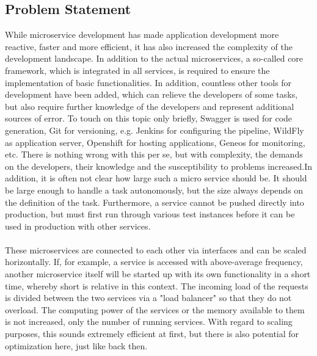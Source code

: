 \documentclass[a4paper,twoside,11pt, pagesize]{scrartcl}
\begin{document}
\begin{spacing}{1.2}
\subsection{Problem Statement}
While microservice development has made application development more reactive, faster and more efficient, it has also increased the complexity of the development landscape. In addition to the actual microservices, a so-called core framework, which is integrated in all services, is required to ensure the implementation of basic functionalities. In addition, countless other tools for development have been added, which can relieve the developers of some tasks, but also require further knowledge of the developers and represent additional sources of error. To touch on this topic only briefly, Swagger is used for code generation, Git for versioning, e.g. Jenkins for configuring the pipeline, WildFly as application server, Openshift for hosting applications, Geneos for monitoring, etc. There is nothing wrong with this per se, but with complexity, the demands on the developers, their knowledge and the susceptibility to problems increased.In addition, it is often not clear how large such a micro service should be. It should be large enough to handle a task autonomously, but the size always depends on the definition of the task. Furthermore, a service cannot be pushed directly into production, but must first run through various test instances before it can be used in production with other services.\\\\
These microservices are connected to each other via interfaces and can be scaled horizontally. If, for example, a service is accessed with above-average frequency, another microservice itself will be started up with its own functionality in a short time, whereby short is relative in this context. The incoming load of the requests is divided between the two services via a "load balancer" so that they do not overload. The computing power of the services or the memory available to them is not increased, only the number of running services. With regard to scaling purposes, this sounds extremely efficient at first, but there is also potential for optimization here, just like back then.\\\\

\end{spacing}
\end{document}
